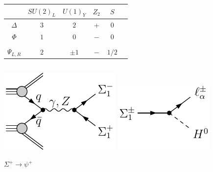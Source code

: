 \documentclass[%
xcolor=dvipsnames,table%
]{beamer}
\begin{document}
\begin{frame}
\begin{columns}
\begin{column}{0.5\textwidth}
\begin{tabular}{|c||c|c|c|c|c|}
\hline 
&  $SU(2)_{L}$ & $  U(1)_{Y}$   & $Z_2$ & $S$
\\ \hline \hline 
 $\Delta$  & $3$&$ 2$ & $+$ & $0$ \\
\hline
 $\Phi$ & $1$&$ 0$  & $-$ & $0$ \\
\hline
& & & &\\
\hline 
 ${\Psi}_{L,R}$ & $2$&$ \pm1$  & $-$ & $1/2$ \\ 
\hline
\end{tabular} 

  \end{column}
\end{columns}

\includegraphics[scale=0.73]{rsiii_prod}\hspace{0.1cm}
\includegraphics[scale=0.73]{rsiii_decay}
{

\vspace{-2cm}
\hspace{8cm} $\Sigma^+\to \psi^+$}

\end{frame}

\end{document}
